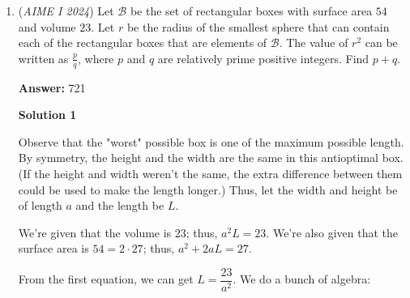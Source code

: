 \begin{enumerate}
 



\textbf{Solution 10 (simplest)}

Obviously, $ABCD$ is a \href{https://artofproblemsolving.com/wiki/index.php?title=Disphenoid}{disphenoid}, and it follows that its circumscribing rectangular prism with nonadjacent vertices $A$, $B$, $C$, and $D$ has a length, width, and height of $4$, $5$, and $8$. Thus, 
 \[[ABCD]=4\cdot 5\cdot 8\left(1-4\cdot\frac 16\right)=\frac{160}{3}.\] Since the distances from $I$ to the faces of $ABCD$ are all equal, let this common value be $x$ and WLOG it follows that

 \begin{align*}\frac 13x[ABC]&=[IABC],\\2x\sqrt{21}&=\frac 14\cdot\frac{160}{3},\\x&=\frac{20\sqrt{21}}{63}\\\end{align*}


 through Heron's formula, so the desired value is $\boxed{104}$.

 -pieMax2713

 


 


	\item (\textit{AIME I 2024}) Let $\mathcal{B}$ be the set of rectangular boxes with surface area $54$ and volume $23$. Let $r$ be the radius of the smallest sphere that can contain each of the rectangular boxes that are elements of $\mathcal{B}$. The value of $r^2$ can be written as $\frac{p}{q}$, where $p$ and $q$ are relatively prime positive integers. Find $p+q$.


 
 \textbf{Answer: }721



\textbf{Solution 1}

Observe that the "worst" possible box is one of the maximum possible length. By symmetry, the height and the width are the same in this antioptimal box. (If the height and width weren't the same, the extra difference between them could be used to make the length longer.) Thus, let the width and height be of length $a$ and the length be $L$. 

 We're given that the volume is $23$; thus, $a^2L=23$. We're also given that the surface area is $54=2\cdot27$; thus, $a^2+2aL=27$. 

 From the first equation, we can get $L=\dfrac{23}{a^2}$. We do a bunch of algebra: 


\end{enumerate}
